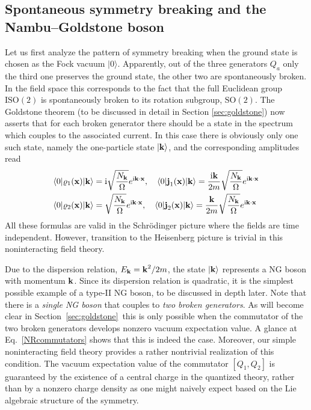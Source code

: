\documentclass[final,2p,times,12pt,sort&compress]{elsarticle}
\newcommand\gr[1]{\mathrm{#1}}              %
\newcommand\vek[1]{{\boldsymbol{\bf #1}}}   %
\newcommand\skal[2]{\vek{#1}\cdot\vek{#2}}  %
\newcommand\bra[1]{\langle#1\vert}          %
\newcommand\ket[1]{\vert#1\rangle}          %
\newcommand\imag{\mathrm i}                 %
\newcommand\vr{\varrho}
\begin{document}
\subsection{Spontaneous symmetry breaking and the Nambu--Goldstone boson}
Let us first analyze the pattern of symmetry breaking when the ground state is
chosen as the Fock vacuum $\ket0$. Apparently, out of the three generators $Q_a$
only the third one preserves the ground state, the other two are spontaneously
broken. In the field space this corresponds to the fact that the full Euclidean
group $\gr{ISO(2)}$ is spontaneously broken to its rotation subgroup,
$\gr{SO(2)}$. The Goldstone theorem (to be discussed in detail in Section
\ref{sec:goldstone}) now asserts that for each broken generator
there should be a state in the spectrum which couples to the associated current.
In this case there is obviously only one such state, namely the one-particle
state $\ket{\vek k}$, and the corresponding amplitudes read
\begin{equation}
\begin{split}
\bra0\vr_1(\vek x)\ket{\vek k}&=\imag
\sqrt{\frac{N_{\vek k}}{\Omega}}e^{\imag\skal kx},\quad
\bra0\vek j_1(\vek x)\ket{\vek k}=\frac{\imag\vek k}{2m}
\sqrt{\frac{N_{\vek k}}{\Omega}}e^{\imag\skal kx}\\
\bra0\vr_2(\vek x)\ket{\vek k}&=
\sqrt{\frac{N_{\vek k}}{\Omega}}e^{\imag\skal kx},\quad
\bra0\vek j_2(\vek x)\ket{\vek k}=\frac{\vek k}{2m}
\sqrt{\frac{N_{\vek k}}{\Omega}}e^{\imag\skal kx}
\end{split}
\end{equation}
All these formulas are valid in the Schr\"odinger picture where the fields are
time independent. However, transition to the Heisenberg picture is trivial in
this noninteracting field theory.

Due to the dispersion relation, $E_{\vek k}=\vek k^2/2m$, the state $\ket{\vek
k}$ represents a NG boson with momentum $\vek k$. Since its dispersion relation
is quadratic, it is the simplest possible example of a type-II NG boson,
to be discussed in depth later. Note that there is a \emph{single NG boson}
that couples to \emph{two broken generators}. As will become clear in
Section~\ref{sec:goldstone}\ this is only possible when the commutator of the
two broken generators develops nonzero vacuum expectation value. A glance at
Eq.~\eqref{NRcommutators} shows that this is indeed the case. Moreover, our
simple noninteracting field theory provides a rather nontrivial realization of
this condition. The vacuum expectation value of the commutator
$[Q_1,Q_2]$ is guaranteed by the existence of a central charge in the quantized
theory, rather than by a nonzero charge density as one might naively expect
based on the Lie algebraic structure of the symmetry.
\end{document}
